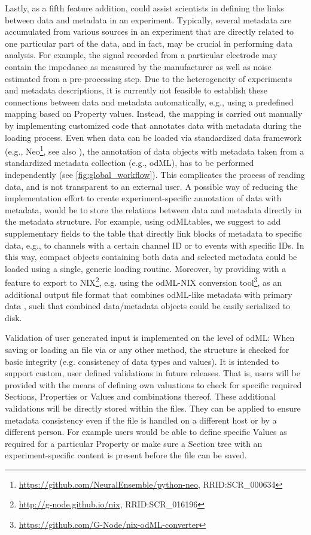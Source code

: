 Lastly, as a fifth feature addition,  could assist scientists in defining the links between data and metadata in an experiment. Typically, several metadata are accumulated from various sources in an experiment that are directly related to one particular part of the data, and in fact, may be crucial in performing data analysis. For example, the signal recorded from a particular electrode may contain the impedance as measured by the manufacturer as well as noise estimated from a pre-processing step. Due to the heterogeneity of experiments and metadata descriptions, it is currently not feasible to establish these connections between data and metadata automatically, e.g., using a predefined mapping based on Property values. Instead, the mapping is carried out manually by implementing customized code that annotates data with metadata during the loading process. Even when data can be loaded via standardized data framework (e.g., Neo\footnote{\url{https://github.com/NeuralEnsemble/python-neo}, RRID:SCR\_000634}, see also \citealp{Garcia_2014}), the annotation of data objects with metadata taken from a standardized metadata collection (e.g., odML), has to be performed independently (see \cref{fig:global_workflow}). This complicates the process of reading data, and is not transparent to an external user. A possible way of reducing the implementation effort to create experiment-specific annotation of data with metadata, would be to store the relations between data and metadata directly in the metadata structure. For example, using odMLtables, we suggest to add supplementary fields to the table that directly link blocks of metadata to specific data, e.g., to channels with a certain channel ID or to events with specific IDs. In this way, compact objects containing both data and selected metadata could be loaded using a single, generic loading routine. Moreover, by providing  with a feature to export to NIX\footnote{\url{http://g-node.github.io/nix}, RRID:SCR\_016196}, e.g. using the odML-NIX conversion tool\footnote{\url{https://github.com/G-Node/nix-odML-converter}}, as an additional output file format that combines odML-like metadata with primary data \citep{Stoewer_2014}, such that combined data/metadata objects could be easily serialized to disk.

Validation of user generated input is implemented on the level of odML: When saving or loading an  file via  or any other method, the  structure is checked for basic integrity (e.g. consistency of data types and values). It is intended to support custom, user defined validations in future releases. That is, users will be provided with the means of defining own valuations to check for specific required Sections, Properties or Values and combinations thereof. These additional validations will be directly stored within the  files. They can be applied to ensure metadata consistency even if the file is handled on a different host or by a different person.
For example users would be able to define specific Values as required for a particular Property or make sure a Section tree with an experiment-specific content is present before the file can be saved.

